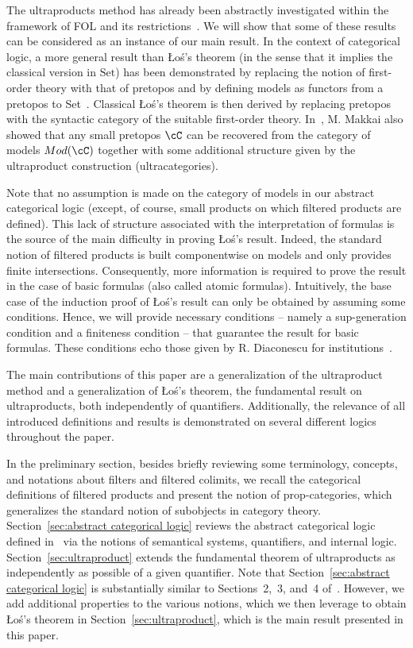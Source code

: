 \documentclass[preprint,3p,times]{elsarticle}
\newcommand{\Set}{\mathrm{Set}}
\newcommand{\Los}{\L{}o{\'s}}
\begin{document}
\medskip
The ultraproducts method has already been abstractly investigated within the framework of FOL and its restrictions~\cite{AN78,Dia08,Dia17}. We will show that some of these results can be considered as an instance of our main result. 
In the context of categorical logic, a more general result than \Los's theorem (in the sense that it implies the classical version in \(\Set\)) has been demonstrated by replacing the notion of first-order theory with that of pretopos and by defining models as functors from a pretopos to Set~\cite{Mak87}. Classical \Los's theorem is then derived by replacing pretopos with the syntactic category of the suitable first-order theory.
In~\cite{Mak87}, M. Makkai also showed that any small pretopos $\cC$ can be recovered from the category of models $Mod(\cC)$ together with some additional structure given by the ultraproduct construction (ultracategories).

\medskip
Note that no assumption is made on the category of models in our abstract categorical logic (except, of course, small products on which filtered products are defined). This lack of structure associated with the interpretation of formulas is the source of the main difficulty in proving \Los's result. Indeed, the standard notion of filtered products is built componentwise on models and only provides finite intersections. Consequently, more information is required to prove the result in the case of basic formulas (also called atomic formulas). Intuitively, the base case of the induction proof of \Los's result can only be obtained by assuming some conditions. Hence, we will provide necessary conditions -- namely a sup-generation condition and a finiteness condition -- that guarantee the result for basic formulas. These conditions echo those given by R. Diaconescu for institutions~\cite{Dia08}.

The main contributions of this paper are a generalization of the ultraproduct method and a generalization of \Los's theorem, the fundamental result on ultraproducts, both independently of quantifiers. Additionally, the relevance of all introduced definitions and results is demonstrated on several different logics throughout the paper.

\medskip
In the preliminary section, besides briefly reviewing some terminology, concepts, and notations about filters and filtered colimits, we recall the categorical definitions of filtered products and present the notion of prop-categories, which generalizes the standard notion of subobjects in category theory. %
Section~\ref{sec:abstract categorical logic} reviews the abstract categorical logic defined in~\cite{AB23} via the notions of semantical systems, quantifiers, and internal logic. Section~\ref{sec:ultraproduct} extends the fundamental theorem of ultraproducts as independently as possible of a given quantifier. Note that Section~\ref{sec:abstract categorical logic} is substantially similar to Sections~2,~3, and~4 of~\cite{AB23}. However, we add additional properties to the various notions, which we then leverage to obtain \Los's theorem in Section~\ref{sec:ultraproduct}, which is the main result presented in this paper.
\end{document}
